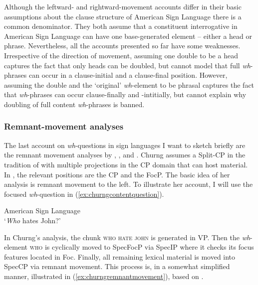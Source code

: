 \noindent Although the leftward- and rightward-movement accounts differ in their basic assumptions about the clause structure of American Sign Language there is a common denominator. They both assume that a constituent interrogative in American Sign Language can have one base-generated element -- either a head or phrase. Nevertheless, all the accounts presented so far have some weaknesses. Irrespective of the direction of movement, assuming one double to be a head captures the fact that only heads can be doubled, but cannot model that full \textit{wh}-phrases can occur in a clause-initial and a clause-final position. However, assuming the double and the `original' \textit{wh}-element to be phrasal captures the fact that \textit{wh}-phrases can occur clause-finally and -intitially, but cannot explain why doubling of full content \textit{wh}-phrases is banned. 

\subsubsection{Remnant-movement analyses}

The last account on \textit{wh}-questions in sign languages I want to sketch briefly are the remnant movement analyses by \citet{churng2006synchronizing, churng2007double, churng2009syntax}, \citet{sarac2007cross}, and \citet{aboh2010sa}. Churng assumes a Split-CP in the tradition of \citet{rizzi1997fine} with multiple projections in the CP domain that can host material. In \citet{churng2009syntax}, the relevant positions are the CP and the FocP. The basic idea of her analysis is remnant movement to the left. To illustrate her account, I will use the focused \textit{wh}-question in (\ref{ex:churngcontentquestion}).

\begin{exe}
\ex American Sign Language \citep[39]{churng2009syntax} \\ 
\glt `\textit{Who} hates John?' \label{ex:churngcontentquestion} 
\end{exe}

\noindent In Churng's analysis, the chunk \textsc{who hate john} is generated in VP. Then the \textit{wh}-element \textsc{who} is cyclically moved to SpecFocP via SpecIP where it checks its focus features located in Foc\textdegree . Finally, all remaining lexical material is moved into SpecCP via remnant movement. This process is, in a somewhat simplified manner, illustrated in (\ref{ex:churngremnantmovement}), based on \citet[38]{churng2009syntax}.



